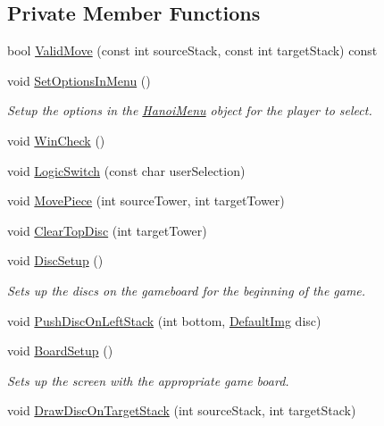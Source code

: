 \subsection*{Private Member Functions}
\begin{DoxyCompactItemize}
\item 
bool \hyperlink{classHanoi_a509e940edaa6135c5b883c93c901e38f}{Valid\-Move} (const int source\-Stack, const int target\-Stack) const 
\item 
void \hyperlink{classHanoi_a4dd4c6028ade2b265ce98e48c3f2fb2a}{Set\-Options\-In\-Menu} ()
\begin{DoxyCompactList}\small\item\em Setup the options in the \hyperlink{classHanoiMenu}{Hanoi\-Menu} object for the player to select. \end{DoxyCompactList}\item 
void \hyperlink{classHanoi_aefbb40fc625506daa131076206e85b69}{Win\-Check} ()
\item 
void \hyperlink{classHanoi_ac2a9f2762281242491b736caae5baea9}{Logic\-Switch} (const char user\-Selection)
\item 
void \hyperlink{classHanoi_ace4cf62c16bc617ac158171a94b9b6a1}{Move\-Piece} (int source\-Tower, int target\-Tower)
\item 
void \hyperlink{classHanoi_af46c88d825078b8255128c53f717cf8d}{Clear\-Top\-Disc} (int target\-Tower)
\item 
void \hyperlink{classHanoi_a95845d40d6b0594cc69612c6421333a2}{Disc\-Setup} ()
\begin{DoxyCompactList}\small\item\em Sets up the discs on the gameboard for the beginning of the game. \end{DoxyCompactList}\item 
void \hyperlink{classHanoi_a47fdd8cbbb4b12ea2941c639868236bc}{Push\-Disc\-On\-Left\-Stack} (int bottom, \hyperlink{classDefaultImg}{Default\-Img} disc)
\item 
void \hyperlink{classHanoi_a5dc7aab5bfe9d0b9d83ba75be22412e2}{Board\-Setup} ()
\begin{DoxyCompactList}\small\item\em Sets up the screen with the appropriate game board. \end{DoxyCompactList}\item 
void \hyperlink{classHanoi_a7ed013f980f79fb4d4bd5efbc0fef633}{Draw\-Disc\-On\-Target\-Stack} (int source\-Stack, int target\-Stack)
\end{DoxyCompactItemize}
